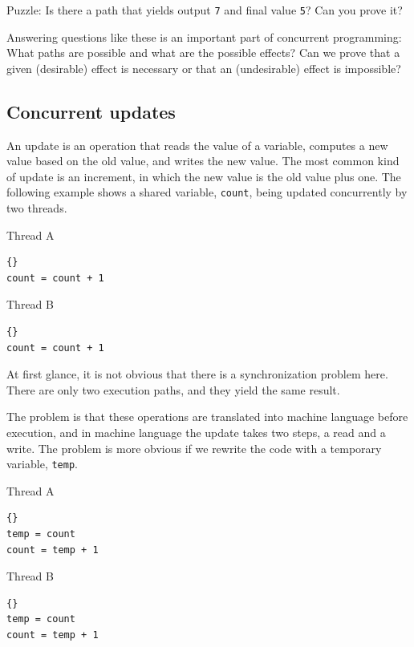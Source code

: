 \documentclass{book}
\begin{document}
Puzzle: Is there a path that yields output {\tt 7} and final
value {\tt 5}?  Can you prove it?

Answering questions like these is an important part of concurrent
programming:  What paths are possible and what are the
possible effects?  Can we prove that a given (desirable) effect is
necessary or that an (undesirable) effect is impossible?


\subsection {Concurrent updates}

An update is an operation that reads the value of a variable, computes
a new value based on the old value, and writes the new value.
The most common kind of update is an increment, in which the
new value is the old value plus one.  The following example
shows a shared variable, {\tt count}, being updated concurrently
by two threads.

\begin{minipage}[t]{2in}
Thread A                
\begin{lstlisting}[labelstyle=a, indent=25pt]{}
count = count + 1
\end{lstlisting}
\end{minipage}
\hfill
\begin{minipage}[t]{2in}
Thread B
\begin{lstlisting}[labelstyle=b, indent=25pt]{}
count = count + 1
\end{lstlisting}
\end{minipage}

At first glance, it is not obvious that there is a synchronization
problem here.  There are only two execution paths, and they
yield the same result.

The problem is that these operations are translated into
machine language before execution, and in machine language
the update takes two steps, a read and a write.
The problem is more obvious if we rewrite the code with a temporary
variable, {\tt temp}.

\begin{minipage}[t]{2in}
Thread A                
\begin{lstlisting}[labelstyle=a, indent=25pt]{}
temp = count
count = temp + 1
\end{lstlisting}
\end{minipage}
\hfill
\begin{minipage}[t]{2in}
Thread B
\begin{lstlisting}[labelstyle=b, indent=25pt]{}
temp = count
count = temp + 1
\end{lstlisting}
\end{minipage}
\end{document}
